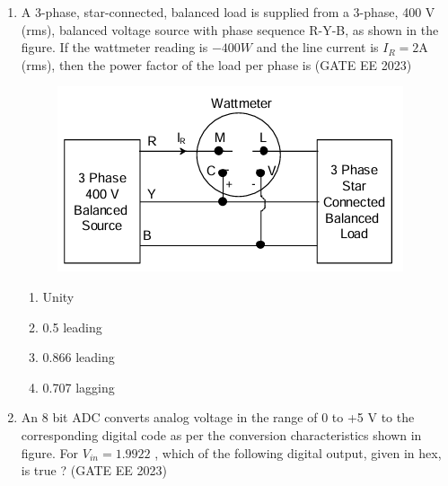 \documentclass[a4paper,12pt]{exam}
\theoremstyle{remark}
\begin{document}
\begin{enumerate}
The frequency at which this compensator produces maximum phase lead is 4~rad/s.
At this frequency, the gain amplification provided by the controller, assuming asymptotic Bode-magnitude plot of $K(s)$, is 6~dB. The values of $\alpha, \beta$, respectively, are
\begin{multicols}{4}
\begin{enumerate}
    \item 1,16
    \item 2,4
    \item 3,5
    \item 2.66, 2.25
\end{enumerate}
\end{multicols}
\item A 3-phase, star-connected, balanced load is supplied from a 3-phase, 400 V (rms), 
balanced voltage source with phase sequence R-Y-B, as shown in the figure. If the 
wattmeter reading is $-400 W$ and the line current is $I_{R}=2 $A (rms), then the power 
factor of the load per phase is \hfill{(GATE EE 2023)}
\begin{figure}[H]
    \centering
    \includegraphics[width=0.5\columnwidth]{figs/Q 39.png}
    \caption{}
    \label{fig:placeholder}
\end{figure}
\begin{multicols}{4}
\begin{enumerate}
    \item Unity
    \item 0.5 leading
    \item 0.866 leading
    \item 0.707 lagging
\end{enumerate}
\end{multicols}
\item An 8 bit ADC converts analog voltage in the range of 0 to +5 V to the corresponding 
digital code as per the conversion characteristics shown in figure.  
For  $V_{in}=1.9922$ , which of the following digital output, given in hex, is true ? \hfill{(GATE EE 2023)}


\end{enumerate}
\end{document}
